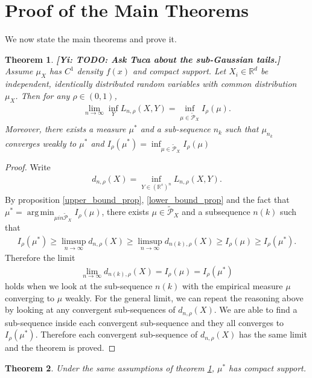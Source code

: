 \documentclass[10pt]{article}
\DeclareMathOperator*{\argmin}{arg\,min}
\newcommand{\gy}[1]{\textbf{\color{gred}[Yi: #1]}}
\newtheorem{theorem}{\bf Theorem}
\newenvironment{Proof of lemma}{\noindent{\bf Proof of Lemma}}{\hfill$\Box$\newline}
\newenvironment{Proof of claim}{\noindent{\bf Proof of claim}}{\hfill$\Box$\newline}
\newenvironment{Proof of theorem}{\noindent{\bf Proof of Theorem}}{\hfill\scriptsize{$\Box$}\newline}
\newenvironment{Proof of theorems}{\noindent{\bf Proof of Theorems}}{\hfill$\Box$\newline}
\newenvironment{Proof of proposition}{\noindent{\bf Proof of Proposition}}{\hfill$\Box$\newline}
\newenvironment{Proof of propositions}{\noindent{\bf Proof of Propositions}}{\hfill$\Box$\newline}
\newenvironment{Proof of exercise}{\noindent{\it Proof of Exercise:}}{\hfill$\Box$}
\numberwithin{equation}{section}
\begin{document}
\section{Proof of the Main Theorems}
We now state the main theorems and prove it.
\begin{theorem} \label{main_theorem_1}
    \gy{TODO: Ask Tuca about the sub-Gaussian tails.}
    Assume $\mu_X$ has $C^1$ density $f(x)$ and compact support. Let $X_i \in \mathbb{R}^d$ be independent, identically distributed random variables with common distribution $\mu_X$. Then for any $\rho \in (0,1)$,
    \begin{align}
        \lim_{n \to \infty} \inf_Y L_{n,\rho}(X,Y) = \inf_{\mu \in \tilde{\mathcal{P}}_X} I_{\rho}(\mu).
    \end{align}
    Moreover, there exists a measure $\mu^*$ and a sub-sequence $n_k$ such that $\mu_{n_k}$ converges weakly to $\mu^*$ and $I_{\rho}(\mu^*) =\inf_{\mu \in \tilde{\mathcal{P}}_X} I_{\rho}(\mu)$
\end{theorem}
\begin{proof}
    Write
    \begin{align}
        d_{n,\rho}(X) = \inf_{Y \in (\mathbb{R}^s)^n}L_{n,\rho}(X,Y).
    \end{align}
    By proposition \ref{upper_bound_prop}, \ref{lower_bound_prop} and the fact that $\mu^* = \argmin_{\mu in \tilde{\mathcal{P}}_X} I_{\rho}(\mu)$, there exists $\mu \in \tilde{\mathcal{P}}_X$ and a subsequence $n(k)$ such that
    \begin{align}
        I_{\rho}(\mu^*) \geq \limsup_{n \to \infty} d_{n,\rho}(X) \geq \limsup_{n \to \infty} d_{n(k),\rho}(X) \geq I_{\rho}(\mu) \geq I_{\rho}(\mu^*).
    \end{align}
    Therefore the limit
    \begin{align}
        \lim_{n \to \infty} d_{n(k),\rho}(X) = I_{\rho}(\mu) = I_{\rho}(\mu^*)
    \end{align}
    holds when we look at the sub-sequence $n(k)$ with the empirical measure $\mu$ converging to $\mu$ weakly. For the general limit, we can repeat the reasoning above by looking at any convergent sub-sequences of $d_{n,\rho}(X)$. We are able to find a sub-sequence inside each convergent sub-sequence and they all converges to $I_{\rho}(\mu^*)$. Therefore each convergent sub-sequence of $d_{n,\rho}(X)$ has the same limit and the theorem is proved.
\end{proof}
\begin{theorem} \label{main_theorem_2}
    Under the same assumptions of theorem \ref{main_theorem_1}, $\mu^*$ has compact support.
\end{theorem}
\end{document}
